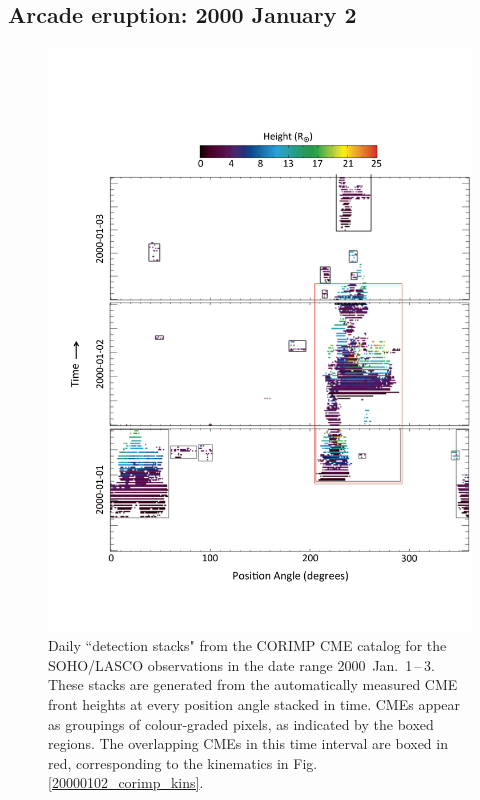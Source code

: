 \documentclass[referee,a4paper,12pt,traditabstract]{swsc}
\begin{document}
\begin{linenumbers}
\subsection{Arcade eruption: 2000 January 2}
\label{sect_20000102}

\begin{figure}[t]
\centerline{\includegraphics[scale=0.5, trim=20 70 0 140, clip=true]{images/pa_total.pdf}}
\caption{Daily ``detection stacks" from the CORIMP CME catalog for the SOHO/LASCO observations in the date range 2000~Jan.~1\,--\,3. These stacks are generated from the automatically measured CME front heights at every position angle stacked in time. CMEs appear as groupings of colour-graded pixels, as indicated by the boxed regions. The overlapping CMEs in this time interval are boxed in red, corresponding to the kinematics in Fig.\,\ref{20000102_corimp_kins}.}
\label{pa_total}
\end{figure}


\end{linenumbers}
\end{document}
